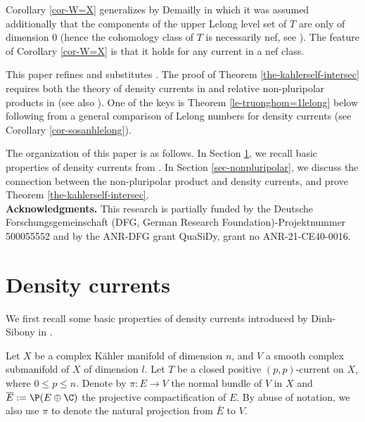     Corollary \ref{cor-W=X} generalizes \cite[Corollary 7.6]{Demailly_regula_11current} by Demailly in which it was assumed additionally that the components of the upper Lelong level set of $T$ are only of dimension $0$ (hence the cohomology class of $T$ is necessarily nef, see \cite[Lemma 6.3]{Demailly_regula_11current}). The feature of Corollary \ref{cor-W=X} is that it holds for any current in a nef class.  

    This paper refines and substitutes \cite{Vu_lelong-bignef-quantitative}. The proof of Theorem \ref{the-kahlerself-intersec} requires both the theory of density currents in \cite{Dinh_Sibony_density} and relative non-pluripolar products in \cite{Viet-generalized-nonpluri} (see also \cite{BT_fine_87,BEGZ}). One of the keys is Theorem \ref{le-truonghom=1lelong} below following from a general comparison of Lelong numbers for density currents (see Corollary \ref{cor-sosanhlelong}).

   The organization of this paper is as follows. In Section \ref{sec-lelong-density}, we recall basic properties of density currents from \cite{Dinh_Sibony_density}. In Section \ref{sec-nonpluripolar}, we discuss the connection between the non-pluripolar product and density currents, and prove Theorem \ref{the-kahlerself-intersec}.\\ 


    \noindent
    \textbf{Acknowledgments.} This research is partially funded by the Deutsche Forschungsgemeinschaft (DFG, German Research Foundation)-Projektnummer 500055552 and by the ANR-DFG grant QuaSiDy, grant no ANR-21-CE40-0016. 




\section{Density currents} \label{sec-lelong-density}

    We first recall some basic properties of density currents introduced by Dinh-Sibony in \cite{Dinh_Sibony_density}. 

    Let $X$ be a complex K\"ahler manifold of dimension $n$, and $V$ a smooth complex submanifold of $X$ of dimension $l.$  Let $T$ be a closed positive $(p,p)$-current on $X,$ where $0 \le p \le n.$  Denote by $\pi: E\to V$ the normal bundle of $V$ in $X$ and $\overline E:= \P(E \oplus \C)$ the projective compactification of $E.$ By abuse of notation, we also use $\pi$ to denote the natural projection from $\overline E$ to $V$. 

